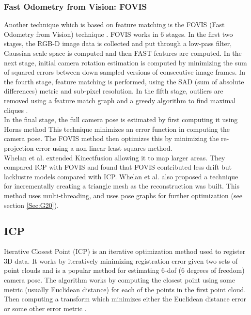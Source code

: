 \subsubsection{Fast Odometry from Vision: FOVIS}

Another technique which is based on feature matching is the FOVIS (Fast Odometry from Vision) technique \cite{Huang17Visual}. FOVIS works in 6 stages. In the first two stages, the RGB-D image data is collected and put through a low-pass filter, Gaussian scale space is computed and then FAST features \cite{Rosten06Machine,Rosten05Fusing} are computed. In the next stage, initial camera rotation estimation is computed by minimizing the sum of squared errors between down sampled versions of consecutive image frames. In the fourth stage, feature matching is performed, using the SAD (sum of absolute differences) metric and sub-pixel resolution. In the fifth stage, outliers are removed using a feature match graph and a greedy algorithm to find maximal cliques \cite{Hirschmuller02Fast,Howard08Real}. \\

In the final stage, the full camera pose is estimated by first computing it using Horns method \cite{Horn87Closed} This technique minimizes an error function in computing the camera pose. The FOVIS method then optimizes this by minimizing the re-projection error using a non-linear least squares method. \\

Whelan et al. \cite{Whelan12Kintinuous} extended Kinectfusion allowing it to map larger areas. They compared ICP with FOVIS and found that FOVIS contributed less drift but lacklustre models compared with ICP. Whelan et al. also proposed a technique for incrementally creating a triangle mesh as the reconstruction was built. This method uses multi-threading, and uses pose graphs for further optimization (see section \ref{Sec:G20}).

\subsection{ICP}

\label{ICPSection}

Iterative Closest Point (ICP) \cite{Besl92Method,Rusinkiewicz01Efficient,Segal09Generalized} is an iterative optimization method used to register 3D data. It works by iteratively minimizing registration error given two sets of point clouds and is a popular method for estimating 6-dof (6 degrees of freedom) camera pose. The algorithm works by computing the closest point using some metric (usually Euclidean distance) for each of the points in the first point cloud. Then computing a transform which minimizes either the Euclidean distance error or some other error metric \cite{Steinbrucker11Real,Tykkala11Direct,Kerl13Robust,Chen92Object,Stuckler12Robust}. \\

